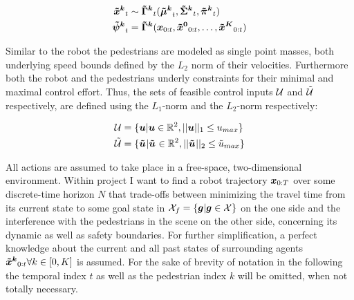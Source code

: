 \begin{align}
\xped[k]_t &\sim \distmodel[k]_t(\muped[k]_t, \sigmaped[k]_t, \piped[k]_t) \\
\dist[k]_t &= \distmodel[k] (\x_{0:t}, \xped[0]_{0:t}, \hdots, \xped[K]_{0:t})
\end{align}

Similar to the robot the pedestrians are modeled as single point masses, both underlying speed bounds defined by the $L_2$ norm of their velocities. Furthermore both the robot and the pedestrians underly constraints for their minimal and maximal control effort. Thus, the sets of feasible control inputs $
\mathcal{U}$ and $\mathcal{\tilde{U}}$ respectively, are defined using the $L_1$-norm and the $L_2$-norm respectively:

\begin{align}
\uset &= \{\u | \u \in \mathbb{R}^2, ||\u||_1 \leq u_{max}\} \\
\upedset &= \{\uped[] | \uped[] \in \mathbb{R}^2, ||\uped[]||_2 \leq \tilde{u}_{max}\} 
\label{eq:controls_bounds}
\end{align}
 
All actions are assumed to take place in a free-space, two-dimensional environment. 
\newline
Within project \project I want to find a robot trajectory $\boldsymbol{x}_{0:T}$ over some discrete-time horizon $N$ that trade-offs between minimizing the travel time from its current state to some goal state in $\mathcal{X}_f = \{\boldsymbol{g} | \boldsymbol{g} \in \mathcal{X} \}$ on the one side and the interference with the pedestrians in the scene on the other side, concerning its dynamic as well as safety boundaries. For further simplification, a perfect knowledge about the current and all past states of surrounding agents $\xped[k]_{0:t} \forall k \in [0, K]$ is assumed.
\newline\newline
For the sake of brevity of notation in the following the temporal index $t$ as well as the pedestrian index $k$ will be omitted, when not totally necessary.
